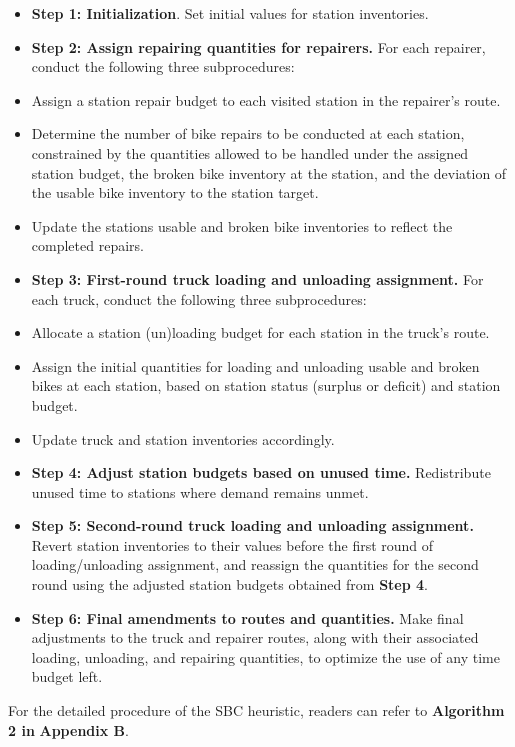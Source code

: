 \begin{itemize}
\item
  \textbf{Step 1: Initialization}. Set initial values for station inventories.
\item
  \textbf{Step 2: Assign repairing quantities for repairers.} For each repairer, conduct the
  following three subprocedures:
\item
  Assign a station repair budget to each visited station in the repairer's route.
\item
  Determine the number of bike repairs to be conducted at each station, constrained by the
  quantities allowed to be handled under the assigned station budget, the broken bike inventory at
  the station, and the deviation of the usable bike inventory to the station target.
\item
  Update the station\textquotesingle s usable and broken bike inventories to reflect the completed
  repairs.
\item
  \textbf{Step 3: First-round truck loading and unloading assignment.} For each truck, conduct the
  following three subprocedures:
\item
  Allocate a station (un)loading budget for each station in the truck's route.
\item
  Assign the initial quantities for loading and unloading usable and broken bikes at each station,
  based on station status (surplus or deficit) and station budget.
\item
  Update truck and station inventories accordingly.
\item
  \textbf{Step 4: Adjust station budgets based on unused time.} Redistribute unused time to
  stations where demand remains unmet.
\item
  \textbf{Step 5: Second-round truck loading and unloading assignment.} Revert station inventories
  to their values before the first round of loading/unloading assignment, and reassign the
  quantities for the second round using the adjusted station budgets obtained from \textbf{Step 4}.
\item
  \textbf{Step 6: Final amendments to routes and quantities.} Make final adjustments to the truck
  and repairer routes, along with their associated loading, unloading, and repairing quantities, to
  optimize the use of any time budget left.
\end{itemize}

For the detailed procedure of the SBC heuristic, readers can refer to \textbf{Algorithm 2 in}
\textbf{Appendix B}.

